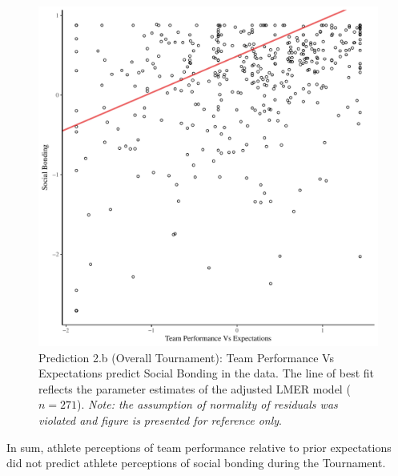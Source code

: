 \begin{CJK}{UTF8}{gbsn}


   \begin{figure}[htbp]
     \centering
   \includegraphics[scale=.5]{images/teamPerfBondOverallModelSlope.pdf}
     \caption{Prediction 2.b (Overall Tournament): Team Performance Vs Expectations predict Social Bonding in the  data. The line of best fit reflects the parameter estimates of the adjusted LMER model ($n = 271$). \textit{Note: the assumption of normality of residuals was violated and figure is presented for reference only}.}
     \label{fig:teamPerfBondOverallModelSlope}
   \end{figure}


In sum, athlete perceptions of team performance relative to prior expectations did not predict athlete perceptions of social bonding during the Tournament.

















\end{CJK}
